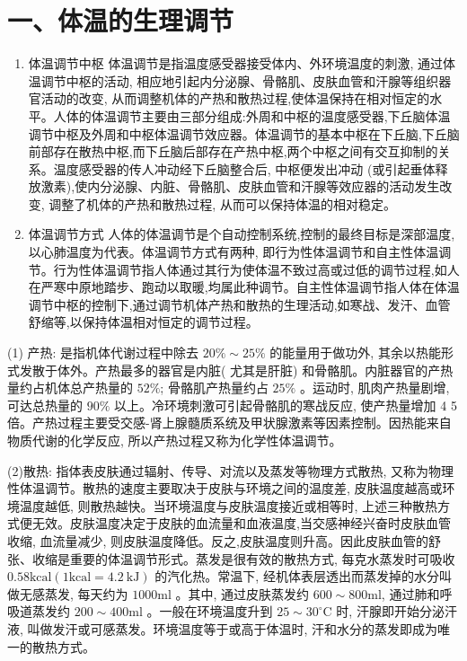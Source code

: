 \documentclass[10pt]{article}
\begin{document}
\section*{一、体温的生理调节}
\begin{enumerate}
  \item 体温调节中枢 体温调节是指温度感受器接受体内、外环境温度的刺激, 通过体温调节中枢的活动, 相应地引起内分泌腺、骨骼肌、皮肤血管和汗腺等组织器官活动的改变, 从而调整机体的产热和散热过程,使体温保持在相对恒定的水平。人体的体温调节主要由三部分组成:外周和中枢的温度感受器,下丘脑体温调节中枢及外周和中枢体温调节效应器。体温调节的基本中枢在下丘脑,下丘脑前部存在散热中枢,而下丘脑后部存在产热中枢,两个中枢之间有交互抑制的关系。温度感受器的传人冲动经下丘脑整合后, 中枢便发出冲动 (或引起垂体释放激素),使内分泌腺、内脏、骨骼肌、皮肤血管和汗腺等效应器的活动发生改变, 调整了机体的产热和散热过程, 从而可以保持体温的相对稳定。

  \item 体温调节方式 人体的体温调节是个自动控制系统,控制的最终目标是深部温度,以心肺温度为代表。体温调节方式有两种, 即行为性体温调节和自主性体温调节。行为性体温调节指人体通过其行为使体温不致过高或过低的调节过程,如人在严寒中原地踏步、跑动以取暖,均属此种调节。自主性体温调节指人体在体温调节中枢的控制下,通过调节机体产热和散热的生理活动,如寒战、发汗、血管舒缩等,以保持体温相对恒定的调节过程。

\end{enumerate}

(1) 产热: 是指机体代谢过程中除去 $20 \% \sim 25 \%$ 的能量用于做功外, 其余以热能形式发散于体外。产热最多的器官是内脏( 尤其是肝脏) 和骨骼肌。内脏器官的产热量约占机体总产热量的 $52 \%$; 骨骼肌产热量约占 $25 \%$ 。运动时, 肌肉产热量剧增, 可达总热量的 $90 \%$ 以上。冷环境刺激可引起骨骼肌的寒战反应, 使产热量增加 4 5 倍。产热过程主要受交感-肾上腺髓质系统及甲状腺激素等因素控制。因热能来自物质代谢的化学反应, 所以产热过程又称为化学性体温调节。

(2)散热: 指体表皮肤通过辐射、传导、对流以及蒸发等物理方式散热, 又称为物理性体温调节。散热的速度主要取决于皮肤与环境之间的温度差, 皮肤温度越高或环境温度越低, 则散热越快。当环境温度与皮肤温度接近或相等时, 上述三种散热方式便无效。皮肤温度决定于皮肤的血流量和血液温度,当交感神经兴奋时皮肤血管收缩, 血流量减少, 则皮肤温度降低。反之,皮肤温度则升高。因此皮肤血管的舒张、收缩是重要的体温调节形式。蒸发是很有效的散热方式, 每克水蒸发时可吸收 $0.58 \mathrm{kcal}(1 \mathrm{kcal}=4.2 \mathrm{~kJ})$ 的汽化热。常温下, 经机体表层透出而蒸发掉的水分叫做无感蒸发, 每天约为 $1000 \mathrm{ml}$ 。其中, 通过皮肤蒸发约 $600 \sim 800 \mathrm{ml}$, 通过肺和呼吸道蒸发约 $200 \sim 400 \mathrm{ml}$ 。一般在环境温度升到 $25 \sim 30^{\circ} \mathrm{C}$ 时, 汗腺即开始分泌汗液, 叫做发汗或可感蒸发。环境温度等于或高于体温时, 汗和水分的蒸发即成为唯一的散热方式。
\end{document}

